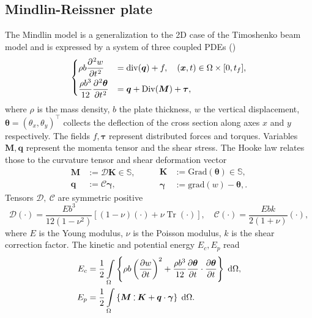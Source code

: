 \documentclass{ifacconf}
\DeclareMathOperator{\Tr}{Tr}
\def\onedot{$\mathsurround0pt\ldotp$}
\def\cddot{%
	\mathbin{\vcenter{\baselineskip.67ex
			\hbox{\onedot}\hbox{\onedot}}%
}}
\begin{document}
\subsection{Mindlin-Reissner plate}
The Mindlin model is a generalization to the 2D case of the Timoshenko beam model and is expressed by a system of three coupled PDEs (\cite{timoshenko1959theory}) 
\begin{equation}
\begin{cases}
\displaystyle \rho b \diffp[2]{w}{t} &= \mathrm{div}(\bm{q}) + f, \quad (\bm{x}, t) \in \Omega \times [0, t_f],  \vspace{1mm}\\
\displaystyle \frac{\rho b^3}{12} \diffp[2]{\bm \theta}{t} &= \bm{q} + \mathrm{Div}(\bm M) + \bm{\tau}, \\
\end{cases}
\end{equation}
where $\rho$ is the mass density, $b$ the plate thickness, $w$ the vertical displacement, $\bm \theta = (\theta_x, \theta_y)^\top$ collects the deflection of the cross section along axes $x$ and $y$ respectively. The fields $f, \bm{\tau}$ represent distributed forces and torques. Variables $\bm{M}, \bm{q}$ represent the momenta tensor and the shear stress. The Hooke law relates those to the curvature tensor and shear deformation vector
\begin{equation*}
\begin{aligned}
\bm{M} &:= \mathcal{D} \bm{K} \in \mathbb{S}, \\ \bm{q} &:= \mathcal{C} \bm{\gamma},
\end{aligned} \qquad
\begin{aligned}
\bm{K} &:= \mathrm{Grad}(\bm{\theta}) \in \mathbb{S}, \\ \bm{\gamma} &:= \mathrm{grad}(w) - \bm{\theta},.
\end{aligned}
\end{equation*}
Tensors $\mathcal{D}, \ \mathcal{C}$ are symmetric positive 
\begin{equation}
\label{eq:bend_rig_tensor}
	\mathcal{D} (\cdot) = \frac{E b^3}{12 (1 - \nu^2)}[(1-\nu)(\cdot) + \nu \Tr(\cdot)], \quad \mathcal{C} (\cdot) = \frac{E b k }{2(1+\nu)}(\cdot),
\end{equation}
where $E$ is the Young modulus, $\nu$ is the Poisson modulus, $k$ is the shear correction factor.
 The kinetic and potential energy  $E_c, E_p$ read
\begin{equation}
\begin{aligned}
E_c &=  \frac{1}{2} \int_{\Omega} \left\{ \rho b \left(\diffp{w}{t} \right)^2 +  \frac{\rho b^3}{12} \diffp{\bm{\theta}}{t} \cdot \diffp{\bm{\theta}}{t}  \right\} \d\Omega, \\
E_p &= \frac{1}{2} \int_{\Omega} \left\{ \bm{M} \cddot \bm{K} + \bm{q} \cdot \bm{\gamma}  \right\}\d\Omega.
\end{aligned}
\end{equation} 
\end{document}
